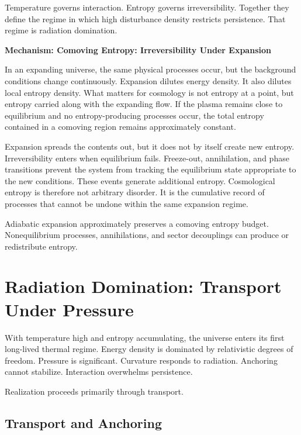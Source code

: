 \documentclass[11pt,twoside,openright]{book}
\newenvironment{mechanismbox}[1]
  {\begin{framed}\noindent\textbf{Mechanism: #1}\par\medskip}
  {\end{framed}}
\begin{document}
Temperature governs interaction. Entropy governs irreversibility. Together they define the regime in which high disturbance density restricts persistence. That regime is radiation domination.

\begin{mechanismbox}{Comoving Entropy: Irreversibility Under Expansion}

In an expanding universe, the same physical processes occur, but the background conditions change continuously. Expansion dilutes energy density. It also dilutes local entropy density. What matters for cosmology is not entropy at a point, but entropy carried along with the expanding flow. If the plasma remains close to equilibrium and no entropy-producing processes occur, the total entropy contained in a comoving region remains approximately constant.

Expansion spreads the contents out, but it does not by itself create new entropy. Irreversibility enters when equilibrium fails. Freeze-out, annihilation, and phase transitions prevent the system from tracking the equilibrium state appropriate to the new conditions. These events generate additional entropy. Cosmological entropy is therefore not arbitrary disorder. It is the cumulative record of processes that cannot be undone within the same expansion regime.

Adiabatic expansion approximately preserves a comoving entropy budget. Nonequilibrium processes, annihilations, and sector decouplings can produce or redistribute entropy.

\end{mechanismbox}

\chapter{Radiation Domination: Transport Under Pressure}

With temperature high and entropy accumulating, the universe enters its first long-lived thermal regime. Energy density is dominated by relativistic degrees of freedom. Pressure is significant. Curvature responds to radiation. Anchoring cannot stabilize. Interaction overwhelms persistence.

Realization proceeds primarily through transport.

\section*{Transport and Anchoring}
\end{document}

